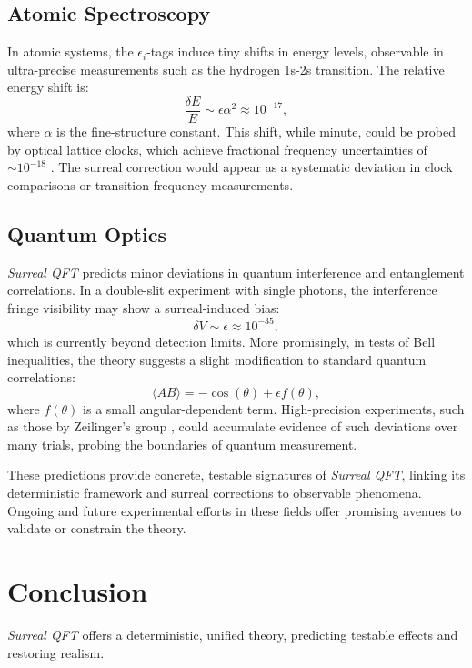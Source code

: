 \documentclass{article}
\begin{document}
\subsection{Atomic Spectroscopy}
In atomic systems, the \(\epsilon_i\)-tags induce tiny shifts in energy levels, observable in ultra-precise measurements such as the hydrogen 1s-2s transition. The relative energy shift is:
\begin{equation}
\frac{\delta E}{E} \sim \epsilon \alpha^2 \approx 10^{-17},
\end{equation}
where \(\alpha\) is the fine-structure constant. This shift, while minute, could be probed by optical lattice clocks, which achieve fractional frequency uncertainties of \(\sim 10^{-18}\) \cite{Ludlow2015}. The surreal correction would appear as a systematic deviation in clock comparisons or transition frequency measurements.

\subsection{Quantum Optics}
\textit{Surreal QFT} predicts minor deviations in quantum interference and entanglement correlations. In a double-slit experiment with single photons, the interference fringe visibility may show a surreal-induced bias:
\begin{equation}
\delta V \sim \epsilon \approx 10^{-35},
\end{equation}
which is currently beyond detection limits. More promisingly, in tests of Bell inequalities, the theory suggests a slight modification to standard quantum correlations:
\begin{equation}
\langle A B \rangle = -\cos(\theta) + \epsilon f(\theta),
\end{equation}
where \(f(\theta)\) is a small angular-dependent term. High-precision experiments, such as those by Zeilinger’s group \cite{Zeilinger2017}, could accumulate evidence of such deviations over many trials, probing the boundaries of quantum measurement.

These predictions provide concrete, testable signatures of \textit{Surreal QFT}, linking its deterministic framework and surreal corrections to observable phenomena. Ongoing and future experimental efforts in these fields offer promising avenues to validate or constrain the theory.

\section{Conclusion}
\textit{Surreal QFT} offers a deterministic, unified theory, predicting testable effects and restoring realism.
\end{document}
